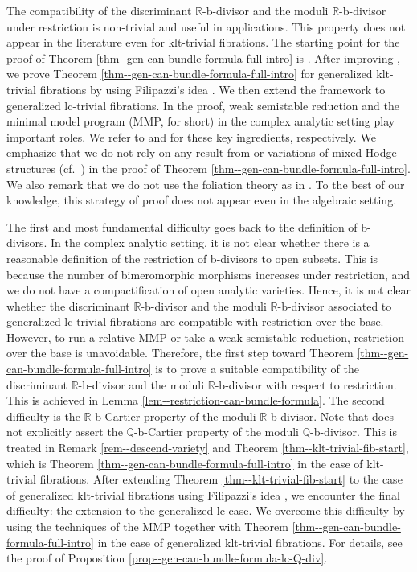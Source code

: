 \documentclass[12pt]{amsart}
\theoremstyle{definition}
\begin{document}
The compatibility of the discriminant $\mathbb{R}$-b-divisor and the moduli $\mathbb{R}$-b-divisor under restriction is non-trivial and useful in applications. 
This property does not appear in the literature even for klt-trivial fibrations. 
The starting point for the proof of Theorem \ref{thm--gen-can-bundle-formula-full-intro} is \cite[Theorem 21.4]{fujino-analytic-bchm}. 
After improving \cite[Theorem 21.4]{fujino-analytic-bchm}, we prove Theorem \ref{thm--gen-can-bundle-formula-full-intro} for generalized klt-trivial fibrations by using Filipazzi's idea \cite{filipazzi-gen-can-bundle-formula}.
We then extend the framework to generalized lc-trivial fibrations. In the proof, weak semistable reduction and the minimal model program (MMP, for short) in the complex analytic setting play important roles. 
We refer to \cite{eh-semistablereduction} and \cite{eh-analytic-mmp} for these key ingredients, respectively. We emphasize that we do not rely on any result from \cite{bfmt} or variations of mixed Hodge structures (cf.~\cite[Theorem 3.6]{fg-lctrivial}) in the proof of Theorem \ref{thm--gen-can-bundle-formula-full-intro}. 
We also remark that we do not use the foliation theory as in \cite{chlx}.  
To the best of our knowledge, this strategy of proof does not appear even in the algebraic setting. 

The first and most fundamental difficulty goes back to the definition of b-divisors. 
In the complex analytic setting, it is not clear whether there is a reasonable definition of the restriction of b-divisors to open subsets. 
This is because the number of bimeromorphic morphisms increases under restriction, and we do not have a compactification of open analytic varieties. 
Hence, it is not clear whether the discriminant $\mathbb{R}$-b-divisor and the moduli $\mathbb{R}$-b-divisor associated to generalized lc-trivial fibrations are compatible with restriction over the base. 
However, to run a relative MMP or take a weak semistable reduction, restriction over the base is unavoidable. 
Therefore, the first step toward Theorem \ref{thm--gen-can-bundle-formula-full-intro} is to prove a suitable compatibility of the discriminant $\mathbb{R}$-b-divisor and the moduli $\mathbb{R}$-b-divisor with respect to restriction. 
This is achieved in Lemma \ref{lem--restriction-can-bundle-formula}. 
The second difficulty is the $\mathbb{R}$-b-Cartier property of the moduli $\mathbb{R}$-b-divisor. 
Note that \cite[Theorem 21.4]{fujino-analytic-bchm} does not explicitly assert the $\mathbb{Q}$-b-Cartier property of the moduli $\mathbb{Q}$-b-divisor. 
This is treated in Remark \ref{rem--descend-variety} and Theorem \ref{thm--klt-trivial-fib-start}, which is Theorem \ref{thm--gen-can-bundle-formula-full-intro} in the case of klt-trivial fibrations. 
After extending Theorem \ref{thm--klt-trivial-fib-start} to the case of generalized klt-trivial fibrations using Filipazzi's idea \cite{filipazzi-gen-can-bundle-formula}, we encounter the final difficulty: the extension to the generalized lc case. 
We overcome this difficulty by using the techniques of the MMP \cite{eh-analytic-mmp} together with Theorem \ref{thm--gen-can-bundle-formula-full-intro} in the case of generalized klt-trivial fibrations. 
For details, see the proof of Proposition \ref{prop--gen-can-bundle-formula-lc-Q-div}. 
\end{document}

